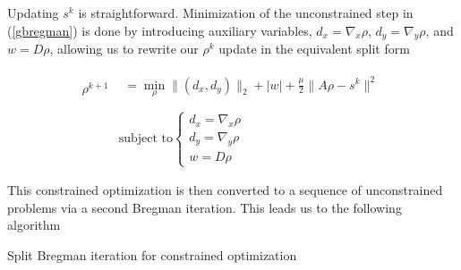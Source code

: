\documentclass[11pt]{amsart}
\theoremstyle{remark}
\begin{document}
Updating $s^k$ is straightforward. Minimization of the unconstrained step in (\ref{gbregman}) is done by introducing auxiliary variables, $d_x = \nabla_x \rho$, $d_y = \nabla_y \rho$, and $w = D\rho$, allowing us to rewrite our $\rho^k$ update in the equivalent split form

\begin{align}\label{spilt}
    \rho^{k+1} & \left.\begin{array}{l} = \min_\rho \|(d_x,d_y)\|_2 + | w | + \frac{\mu}{2} \| A\rho - s^k \|^2 \\ \end{array}\right. \\
        & 
\text{subject to} \left\{ \begin{array}{l}
       d_x = \nabla_x \rho  \\
       d_y = \nabla_y \rho  \\
       w = D \rho
    \end{array}\right. 
\end{align}

This constrained optimization is then converted to a sequence of unconstrained problems via a second Bregman iteration. This leads us to the following algorithm

\begin{algorithm}[H]
\caption{Split Bregman iteration for constrained optimization}
\label{sbalgo}


\end{algorithm}
\end{document}

